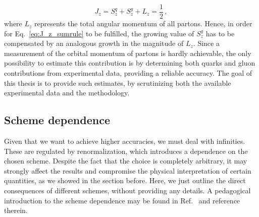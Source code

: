 \begin{equation}
  J_{z} = S_{z}^{q} + S_{z}^{g} + L_z = \frac{1}{2} \,, 
  \label{eq:J_z_sumrule}
\end{equation} 
where $L_z$ represents the total angular momentum of all partons. Hence, in order for Eq.~\eqref{eq:J_z_sumrule} to be fulfilled, the growing value of $S_{z}^{g}$ has to be compensated by an analogous growth in the magnitude of $L_{z}$. Since a measurement of the orbital momentum of partons is hardly achievable, the only possibility to estimate this contribution is by determining both quarks and gluon contributions from experimental data, providing a reliable accuracy. The goal of this thesis is to provide such estimates, by scrutinizing both the available experimental data and the methodology.

\subsection{Scheme dependence}
Given that we want to achieve higher accuracies, we must deal with infinities. These are regulated by renormalization, which introduces a dependence on the chosen scheme. Despite the fact that the choice is completely arbitrary, it may strongly affect the results and compromise the physical interpretation of certain quantities, as we showed in the section before. Here, we just outline the direct consequences of different schemes, without providing any details. A pedagogical introduction to the scheme dependence may be found in Ref.~\cite{leader_2001} and reference therein. 
